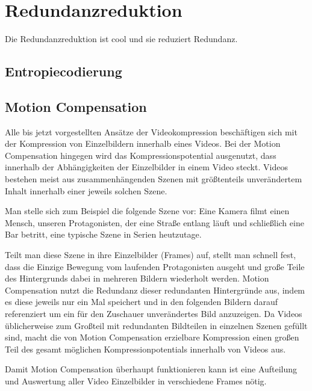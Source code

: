 \chapter{Redundanzreduktion}
\label{kap:Redundanzreduktion}

Die Redundanzreduktion ist cool und sie reduziert Redundanz.

\section{Entropiecodierung}

\section{Motion Compensation}

Alle bis jetzt vorgestellten Ansätze der Videokompression beschäftigen sich mit der Kompression von Einzelbildern innerhalb eines Videos. Bei der Motion Compensation hingegen wird das Kompressionspotential ausgenutzt, dass innerhalb der Abhängigkeiten der Einzelbilder in einem Video steckt.
Videos bestehen meist aus zusammenhängenden Szenen mit größtenteils unverändertem Inhalt innerhalb einer jeweils solchen Szene.

Man stelle sich zum Beispiel die folgende Szene vor: Eine Kamera filmt einen Mensch, unseren Protagonisten, der eine Straße entlang läuft und schließlich eine Bar betritt, eine typische Szene in Serien heutzutage.

Teilt man diese Szene in ihre Einzelbilder (Frames) auf, stellt man schnell fest, dass die Einzige Bewegung vom laufenden Protagonisten ausgeht und große Teile des Hintergrunds dabei in mehreren Bildern wiederholt werden.
Motion Compensation nutzt die Redundanz dieser redundanten Hintergründe aus, indem es diese jeweils nur ein Mal speichert und in den folgenden Bildern darauf referenziert um ein für den Zuschauer unverändertes Bild anzuzeigen.
Da Videos üblicherweise zum Großteil mit redundanten Bildteilen in einzelnen Szenen gefüllt sind, macht die von Motion Compensation erzielbare Kompression einen großen Teil des gesamt möglichen Kompressionpotentials innerhalb von Videos aus.

Damit Motion Compensation überhaupt funktionieren kann ist eine Aufteilung und Auswertung aller Video Einzelbilder in verschiedene Frames nötig.
